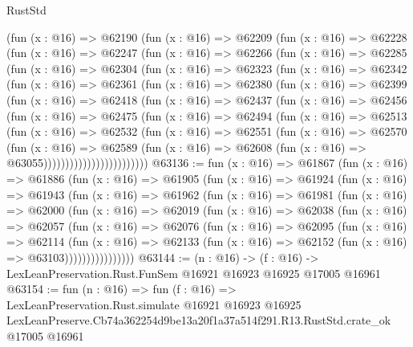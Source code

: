 \begin{lexlean}{RustStd}
\begin{coremodule}
    (fun (x : @16) =>
    @62190
      (fun (x : @16) =>
      @62209
        (fun (x : @16) =>
        @62228
          (fun (x : @16) =>
          @62247
            (fun (x : @16) =>
            @62266
              (fun (x : @16) =>
              @62285
                (fun (x : @16) =>
                @62304
                  (fun (x : @16) =>
                  @62323
                    (fun (x : @16) =>
                    @62342
                      (fun (x : @16) =>
                      @62361
                        (fun (x : @16) =>
                        @62380
                          (fun (x : @16) =>
                          @62399
                            (fun (x : @16) =>
                            @62418
                              (fun (x : @16) =>
                              @62437
                                (fun (x : @16) =>
                                @62456
                                  (fun (x : @16) =>
                                  @62475
                                    (fun (x : @16) =>
                                    @62494
                                      (fun (x : @16) =>
                                      @62513
                                        (fun (x : @16) =>
                                        @62532
                                          (fun (x : @16) =>
                                          @62551
                                            (fun (x : @16) =>
                                            @62570
                                              (fun (x : @16) =>
                                              @62589
                                                (fun (x : @16) =>
                                                @62608
                                                  (fun (x : @16) => @63055))))))))))))))))))))))))
@63136 := fun (x : @16) =>
  @61867
    (fun (x : @16) =>
    @61886
      (fun (x : @16) =>
      @61905
        (fun (x : @16) =>
        @61924
          (fun (x : @16) =>
          @61943
            (fun (x : @16) =>
            @61962
              (fun (x : @16) =>
              @61981
                (fun (x : @16) =>
                @62000
                  (fun (x : @16) =>
                  @62019
                    (fun (x : @16) =>
                    @62038
                      (fun (x : @16) =>
                      @62057
                        (fun (x : @16) =>
                        @62076
                          (fun (x : @16) =>
                          @62095
                            (fun (x : @16) =>
                            @62114
                              (fun (x : @16) =>
                              @62133
                                (fun (x : @16) => @62152 (fun (x : @16) => @63103))))))))))))))))
@63144 := (n : @16) ->
  (f : @16) -> LexLeanPreservation.Rust.FunSem @16921 @16923 @16925 @17005 @16961
@63154 := fun (n : @16) =>
  fun (f : @16) =>
  LexLeanPreservation.Rust.simulate
    @16921
    @16923
    @16925
    LexLeanPreserve.Cb74a362254d9be13a20f1a37a514f291.R13.RustStd.crate_ok
    @17005
    @16961
\end{coremodule}
\end{lexlean}
